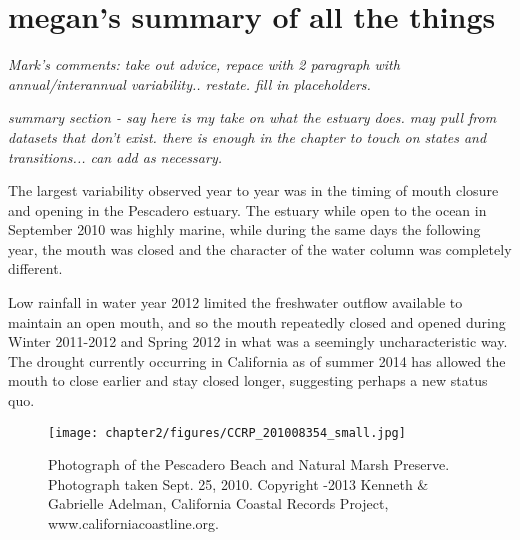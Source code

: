 {	










\section{megan's summary of all the things} \label{backofch2}

\emph{Mark's comments: take out advice, repace with 2 paragraph with annual/interannual variability.. restate. fill in placeholders. }

\emph{summary section - say here is my take on what the estuary does.  may pull from datasets that don't exist.  there is enough in the chapter to touch on states and transitions... can add as necessary.}

The largest variability observed year to year was in the timing of mouth closure and opening in the Pescadero estuary. The estuary while open to the ocean in September 2010 was highly marine, while during the same days the following year, the mouth was closed and the character of the water column was completely different. 

Low rainfall in water year 2012 limited the freshwater outflow available to maintain an open mouth, and so the mouth repeatedly closed and opened during Winter 2011-2012 and Spring 2012 in what was a seemingly uncharacteristic way. The drought currently occurring in California as of summer 2014 has allowed the mouth to close earlier and stay closed longer, suggesting perhaps a new status quo. 







% 
\begin{figure}
\texttt{[image: chapter2/figures/CCRP\_201008354\_small.jpg]} \caption{Photograph of the Pescadero Beach and Natural Marsh Preserve. Photograph taken Sept. 25,
2010. Copyright -2013 Kenneth \& Gabrielle
Adelman, California Coastal Records Project,
www.californiacoastline.org.} \label{fig:ccrp_2010} \end{figure}

}
